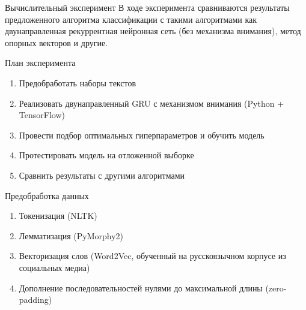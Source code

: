 \documentclass{beamer}
\begin{document}
\begin{frame}{Вычислительный эксперимент}
В ходе эксперимента сравниваются результаты предложенного алгоритма классификации с такими алгоритмами как двунаправленная рекуррентная нейронная сеть (без механизма внимания), метод опорных векторов и другие. \\
\begin{block}{План эксперимента}
	\begin{enumerate}
		\item Предобработать наборы текстов
		\item Реализовать двунаправленный GRU с механизмом внимания  (Python + TensorFlow)
		\item Провести подбор оптимальных гиперпараметров и обучить модель
		\item Протестировать модель на отложенной выборке
		\item Сравнить результаты с другими алгоритмами
	\end{enumerate}
\end{block}
\end{frame}
\begin{frame}{Предобработка данных}

\begin{enumerate}
	\item Токенизация (NLTK)
	\item Лемматизация (PyMorphy2)
	\item Векторизация слов (Word2Vec, обученный на русскоязычном корпусе из социальных медиа)
	\item Дополнение последовательностей нулями до максимальной длины (zero-padding)
	
\end{enumerate}
\end{frame}
\end{document}
